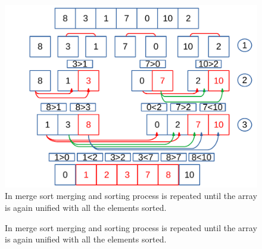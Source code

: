 \begin{figure}[H]
	\begin{center}
		\includegraphics[scale=.52]{chapters/searchandsorting/images/sorting_6.pdf}
		\caption[Merge sort algorithm.]{In merge sort merging and sorting process is repeated until the array is again unified with all the elements sorted.}
		\label{sorting_6}
	\end{center}
\end{figure}

\begin{figure}[H]
\centering
{}

\caption[Merge sort algorithm.]{In merge sort merging and sorting process is repeated until the array is again unified with all the elements sorted.}
\label{sorting_6}
\end{figure}

